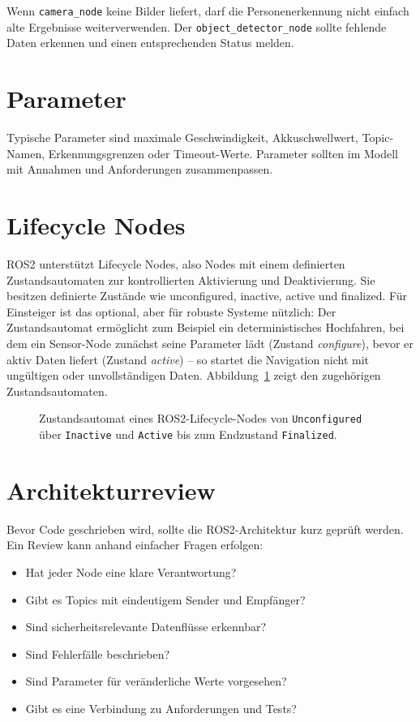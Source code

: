 \begin{praxisbox}
Wenn \texttt{camera\_node} keine Bilder liefert, darf die Personenerkennung nicht einfach alte Ergebnisse weiterverwenden. Der \texttt{object\_detector\_node} sollte fehlende Daten erkennen und einen entsprechenden Status melden.
\end{praxisbox}

\section{Parameter}
Typische Parameter sind maximale Geschwindigkeit, Akkuschwellwert, Topic-Namen, Erkennungsgrenzen oder Timeout-Werte. Parameter sollten im Modell mit Annahmen und Anforderungen zusammenpassen.

\section{Lifecycle Nodes}
ROS2 unterstützt Lifecycle Nodes, also Nodes mit einem definierten Zustandsautomaten zur kontrollierten Aktivierung und Deaktivierung. Sie besitzen definierte Zustände wie unconfigured, inactive, active und finalized. Für Einsteiger ist das optional, aber für robuste Systeme nützlich: Der Zustandsautomat ermöglicht zum Beispiel ein deterministisches Hochfahren, bei dem ein Sensor-Node zunächst seine Parameter lädt (Zustand \emph{configure}), bevor er aktiv Daten liefert (Zustand \emph{active}) – so startet die Navigation nicht mit ungültigen oder unvollständigen Daten. Abbildung~\ref{fig:kap15-lifecycle} zeigt den zugehörigen Zustandsautomaten.

\begin{figure}[H]
  \centering
  \caption{Zustandsautomat eines ROS2-Lifecycle-Nodes von \texttt{Unconfigured} über \texttt{Inactive} und \texttt{Active} bis zum Endzustand \texttt{Finalized}.}
  \label{fig:kap15-lifecycle}
\end{figure}

\section{Architekturreview}
Bevor Code geschrieben wird, sollte die ROS2-Architektur kurz geprüft werden. Ein Review kann anhand einfacher Fragen erfolgen:

\begin{itemize}
    \item Hat jeder Node eine klare Verantwortung?
    \item Gibt es Topics mit eindeutigem Sender und Empfänger?
    \item Sind sicherheitsrelevante Datenflüsse erkennbar?
    \item Sind Fehlerfälle beschrieben?
    \item Sind Parameter für veränderliche Werte vorgesehen?
    \item Gibt es eine Verbindung zu Anforderungen und Tests?
\end{itemize}

